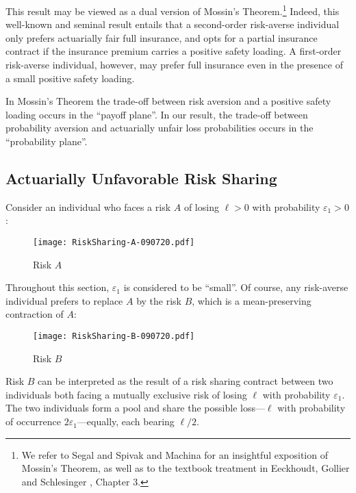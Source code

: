 \documentclass[11pt]{article}
\begin{document}
This result may be viewed as a dual version of Mossin's \cite{M68} Theorem.\footnote{We refer to Segal and Spivak \cite{SS90} and Machina \cite{M13} for an insightful
exposition of Mossin's Theorem,
as well as to the textbook treatment in Eeckhoudt, Gollier and Schlesinger \cite{EGS05}, Chapter 3.}
Indeed, this well-known and seminal result entails that
a second-order risk-averse individual only prefers actuarially fair full insurance,
and opts for a partial insurance contract if the insurance premium carries a positive safety loading.
A first-order risk-averse individual, however, may prefer full insurance
even in the presence of a small positive safety loading.

In Mossin's Theorem the trade-off between risk aversion and a positive safety loading occurs in the ``payoff plane''.
In our result, the trade-off between probability aversion and actuarially unfair loss probabilities occurs in the ``probability plane''.

\subsection{Actuarially Unfavorable Risk Sharing}

Consider an individual who faces a risk $A$ of losing $\ell>0$ with probability $\varepsilon_{1}>0$:
\vskip -0.5cm
\begin{figure}[H]
\begin{center}
\caption{Risk $A$
}
\vskip 0.4cm
\texttt{[image: RiskSharing-A-090720.pdf]}
\label{fig:A}
\end{center}
\end{figure}
\noindent Throughout this section, $\varepsilon_{1}$ is considered to be ``small''.
Of course, any risk-averse individual prefers to replace $A$ by the risk $B$,
which is a mean-preserving contraction of $A$:
\vskip -0.5cm
\begin{figure}[H]
\begin{center}
\caption{Risk $B$
}
\vskip 0.4cm
\texttt{[image: RiskSharing-B-090720.pdf]}
\label{fig:B}
\end{center}
\end{figure}
\noindent Risk $B$ can be interpreted as the result of a risk sharing contract between two individuals
both facing a mutually exclusive risk of losing $\ell$ with probability $\varepsilon_{1}$.
The two individuals form a pool and share the possible loss---$\ell$ with probability of occurrence $2\varepsilon_{1}$---equally,
each bearing $\ell/2$.
\end{document}
